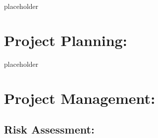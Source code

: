 \documentclass{article}
\begin{document}
placeholder 

\section{Project Planning: }

placeholder 

 

\section{ Project Management: }



\subsection{Risk Assessment: }
\end{document}
